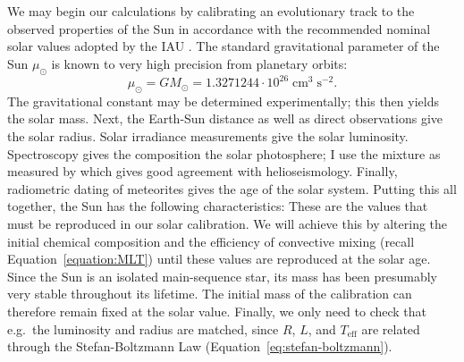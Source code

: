 We may begin our calculations by calibrating an evolutionary track to the observed properties of the Sun \citep[e.g.][]{1982MNRAS.199..735C} in accordance with the recommended nominal solar values adopted by the IAU \citep{2015arXiv151007674M}. 
The standard gravitational parameter of the Sun $\mu_\odot$ is known to very high precision from planetary orbits: 
\begin{equation*}
    \mu_\odot = GM_\odot = 1.3271244 \cdot 10^{26} \; \text{cm}^3 \; \text{s}^{-2}.
\end{equation*}
The gravitational constant may be determined experimentally; this then yields the solar mass. 
Next, the Earth-Sun distance as well as direct observations give the solar radius. 
Solar irradiance measurements give the solar luminosity. 
Spectroscopy gives the composition the solar photosphere; I use the mixture as measured by \citet[][hereinafter \textsc{GS98}]{1998SSRv...85..161G} which gives good agreement with helioseismology. 
Finally, radiometric dating of meteorites gives the age of the solar system. 
Putting this all together, the Sun has the following characteristics: 
These are the values that must be reproduced in our solar calibration. 
We will achieve this by altering the initial chemical composition and the efficiency of convective mixing (recall Equation~\ref{equation:MLT}) until these values are reproduced at the solar age. 
Since the Sun is an isolated main-sequence star, its mass has been presumably very stable throughout its lifetime. 
The initial mass of the calibration can therefore remain fixed at the solar value. 
Finally, we only need to check that e.g.~the luminosity and radius are matched, since $R$, $L$, and $T_{\text{eff}}$ are related through the Stefan-Boltzmann Law (Equation~\ref{eq:stefan-boltzmann}).

